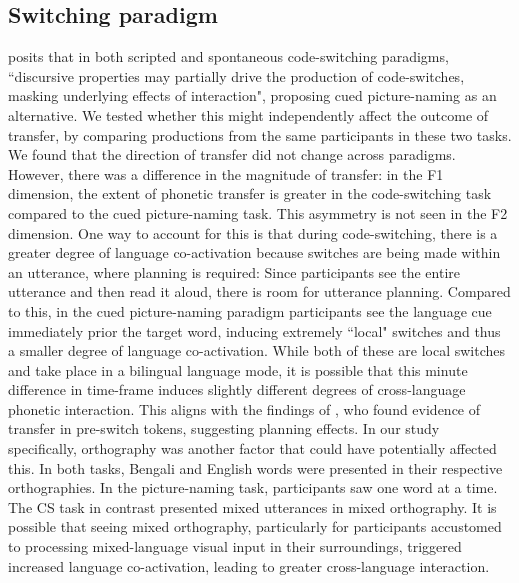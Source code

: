 \documentclass[12 pt]{article}
\begin{document}
\subsection{Switching paradigm}

\cite{olson2013bilingual} posits that in both scripted and spontaneous code-switching paradigms, ``discursive properties may partially drive the production of code-switches, masking underlying effects of interaction", proposing cued picture-naming as an alternative. We tested whether this might independently affect the outcome of transfer, by comparing productions from the same participants in these two tasks. We found that the direction of transfer did not change across paradigms. However, there was a difference in the magnitude of transfer: in the F1 dimension, the extent of phonetic transfer is greater in the code-switching task compared to the cued picture-naming task. This asymmetry is not seen in the F2 dimension.
One way to account for this is that during code-switching, there is a greater degree of language co-activation because switches are being made within an utterance, where planning is required: Since participants see the entire utterance and then read it aloud, there is room for utterance planning. Compared to this, in the cued picture-naming paradigm participants see the language cue immediately prior the target word, inducing extremely ``local" switches and thus a smaller degree of language co-activation. While both of these are local switches and take place in a bilingual language mode, it is possible that this minute difference in time-frame induces slightly different degrees of cross-language phonetic interaction. This aligns with the findings of \cite{bullock2009trying}, who found evidence of transfer in pre-switch tokens, suggesting planning effects. In our study specifically, orthography was another factor that could have potentially affected this. In both tasks, Bengali and English words were presented in their respective orthographies. In the picture-naming task, participants saw one word at a time. The CS task in contrast presented mixed utterances in mixed orthography. It is possible that seeing mixed orthography, particularly for participants accustomed to processing mixed-language visual input in their surroundings, triggered increased language co-activation, leading to greater cross-language interaction.
\end{document}
